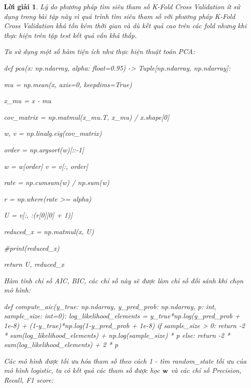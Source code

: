 \documentclass[14pt, a4paper]{article}
\theoremstyle{sltheorem}
\theoremstyle{soltheorem}
\newtheorem*{loigiai}{Lời giải}
\begin{document}
\begin{loigiai}
    Lý do phương pháp tìm siêu tham số K-Fold Cross Validation ít sử dụng trong bài tập này vì quá trình tìm siêu tham số với phương pháp K-Fold Cross Validation khá tốn kém thời gian và dù kết quả cao trên các fold nhưng khi thực hiện trên tập test kết quả vẫn khá thấp.

    Ta sử dụng một số hàm tiện ích như thực hiện thuật toán PCA:

    \begin{python}
def pca(x: np.ndarray, alpha: float=0.95) -> Tuple[np.ndarray, np.ndarray]:
    
    mu = np.mean(x, axis=0, keepdims=True)

    x_mu = x - mu

    cov_matrix = np.matmul(x_mu.T, x_mu) / x.shape[0]

    w, v = np.linalg.eig(cov_matrix)

    order = np.argsort(w)[::-1]

    w = w[order]
    v = v[:, order]

    rate = np.cumsum(w) / np.sum(w)

    r = np.where(rate >= alpha)

    U = v[:, :(r[0][0] + 1)]

    reduced_x = np.matmul(x, U)

    #print(reduced_x)

    return U, reduced_x
    \end{python}

    Hàm tính chỉ số AIC, BIC, các chỉ số này sẽ được làm chỉ số đối sánh khi chọn mô hình:

    \begin{python}
def compute_aic(y_true: np.ndarray, y_pred_prob: np.ndarray, p: int, sample_size: int=0):
    log_likelihood_elements = y_true*np.log(y_pred_prob + 1e-8) + (1-y_true)*np.log(1-y_pred_prob + 1e-8)
    if sample_size > 0:
        return -2 * sum(log_likelihood_elements) + np.log(sample_size) * p
    else:
        return -2 * sum(log_likelihood_elements) + 2 * p
    \end{python}

    Các mô hình được tối ưu hóa tham số theo cách 1 - tìm random\_state tối ưu của mô hình logistic, ta có kết quả các tham số được học $\bold{w}$ và các chỉ số Precision, Recall, F1 score:


\end{loigiai}
\end{document}
